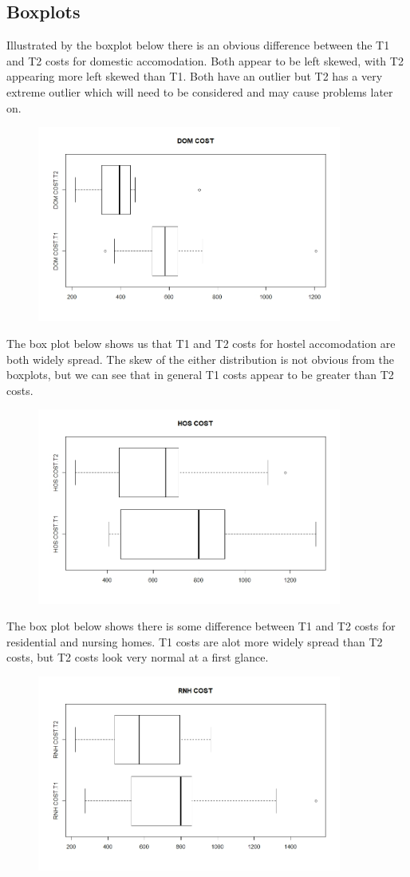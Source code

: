 \documentclass[]{article}
\begin{document}
\subsection{Boxplots}
Illustrated by the boxplot below there is an obvious difference between the T1 and T2 costs for domestic accomodation. Both appear to be left skewed, with T2 appearing more left skewed than T1. Both have an outlier but T2 has a very extreme outlier which will need to be considered and may cause problems later on.
\begin{figure}[H]
\centering
\includegraphics[width=10cm]{RStudio/jpeg/Box_DOM.jpeg}
\end{figure}
The box plot below shows us that T1 and T2 costs for hostel accomodation are both widely spread. The skew of the either distribution is not obvious from the boxplots, but we can see that in general T1 costs appear to be greater than T2 costs.
\begin{figure}[H]
\centering
\includegraphics[width=10cm]{RStudio/jpeg/Box_HOS.jpeg}
\end{figure}
\newpage
The box plot below shows there is some difference between T1 and T2 costs for residential and nursing homes. T1 costs are alot more widely spread than T2 costs, but T2 costs look very normal at a first glance.
\begin{figure}[H]
\centering
\includegraphics[width=10cm]{RStudio/jpeg/Box_RNH.jpeg}
\end{figure}
\end{document}
